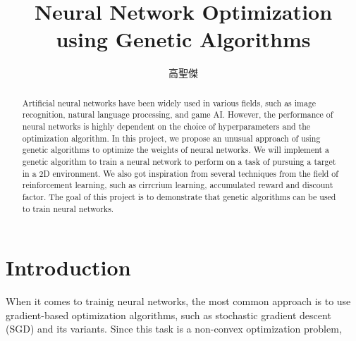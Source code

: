 \documentclass[sigconf]{acmart}
\begin{document}
\title{Neural Network Optimization using Genetic Algorithms}

\begin{CJK}{UTF8}{bkai}
  \author{高聖傑}

\renewcommand{\shortauthors}{Kao et al.}

\begin{abstract}
  Artificial neural networks have been widely used in various fields, such as image recognition, natural language processing, and game AI. However, the performance of neural networks is highly dependent on the choice of hyperparameters and the optimization algorithm. In this project, we propose an unusual approach of using genetic algorithms to optimize the weights of neural networks. We will implement a genetic algorithm to train a neural network to perform on a task of pursuing a target in a 2D environment. We also got inspiration from several techniques from the field of reinforcement learning, such as cirrcrium learning, accumulated reward and discount factor. The goal of this project is to demonstrate that genetic algorithms can be used to train neural networks.
\end{abstract}

\maketitle
\end{CJK}

\section{Introduction}
When it comes to trainig neural networks, the most common approach is to use gradient-based optimization algorithms, such as stochastic gradient descent (SGD) and its variants. Since this task is a non-convex optimization problem, 
\end{document}
